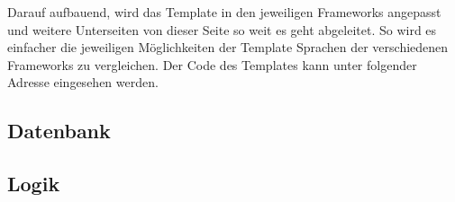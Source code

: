 Darauf aufbauend, wird das Template in den jeweiligen Frameworks angepasst und
weitere Unterseiten von dieser Seite so weit es geht abgeleitet. So wird es
einfacher die jeweiligen Möglichkeiten der Template Sprachen der verschiedenen
Frameworks zu vergleichen. Der Code des Templates kann unter folgender Adresse
eingesehen werden.


\subsection{Datenbank}
\subsection{Logik}